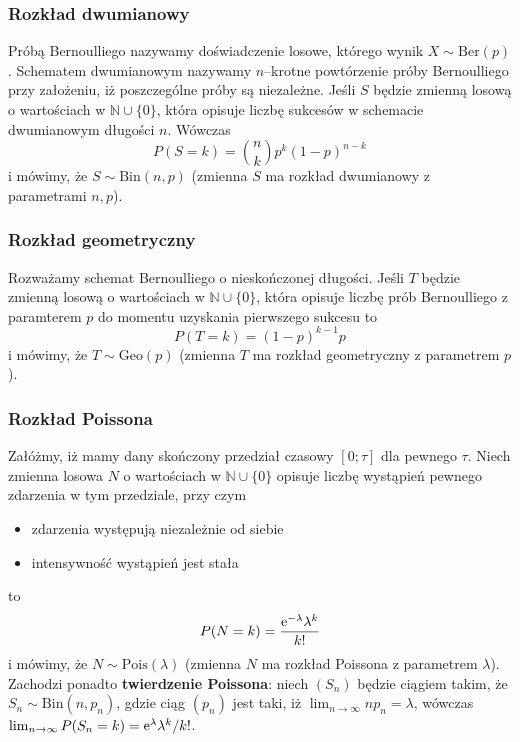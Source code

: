 \documentclass{myclass}
\begin{document}
\subsubsection{Rozkład dwumianowy}
Próbą Bernoulliego nazywamy doświadczenie losowe, którego wynik \(X \sim \text{Ber}(p)\). Schematem
dwumianowym nazywamy \(n\)--krotne powtórzenie próby Bernoulliego przy założeniu, iż poszczególne
próby są niezależne. Jeśli \(S\) będzie zmienną losową o wartościach w \(\mathbb{N} \cup \{0\}\),
która opisuje liczbę sukcesów w schemacie dwumianowym długości \(n\). Wówczas
\begin{equation*}
    P(S = k) = {n \choose k} p^k (1 - p)^{n-k}
\end{equation*}
i mówimy, że \(S \sim \text{Bin}(n, p)\) (zmienna \(S\) ma rozkład dwumianowy z parametrami \(n,
p\)).

\subsubsection{Rozkład geometryczny}
Rozważamy schemat Bernoulliego o nieskończonej długości. Jeśli \(T\) będzie zmienną losową o
wartościach w \(\mathbb{N} \cup \{0\}\), która opisuje liczbę prób Bernoulliego z paramterem \(p\)
do momentu uzyskania pierwszego sukcesu to
\begin{equation*}
    P(T=k) = (1-p)^{k-1}p
\end{equation*}
i mówimy, że \(T \sim \text{Geo}(p)\) (zmienna \(T\) ma rozkład geometryczny z parametrem \(p\)).

\subsubsection{Rozkład Poissona}
Załóżmy, iż mamy dany skończony przedział czasowy \([0; \tau]\) dla pewnego \(\tau\). Niech zmienna
losowa \(N\) o wartościach w \(\mathbb{N} \cup \{0\}\) opisuje liczbę wystąpień pewnego zdarzenia w
tym przedziale, przy czym
\begin{itemize}
    \item zdarzenia występują niezależnie od siebie
    \item intensywność wystąpień jest stała
\end{itemize}
to 
\begin{equation*}
    P(N = k) = \frac{\mathrm{e}^{-\lambda}\lambda^k}{k!}
\end{equation*}
i mówimy, że \(N \sim \text{Pois}(\lambda)\) (zmienna \(N\) ma rozkład Poissona z parametrem
\(\lambda\)). Zachodzi ponadto \textbf{twierdzenie Poissona}: niech \((S_n)\) będzie ciągiem takim,
że \(S_n \sim \text{Bin}(n, p_n)\), gdzie ciąg \((p_n)\) jest taki, iż \(\lim_{n \to \infty} np_n =
\lambda\), wówczas \(\lim_{n\to\infty}P(S_n = k) = \mathrm{e}^\lambda \lambda^k / k!\).
\end{document}
